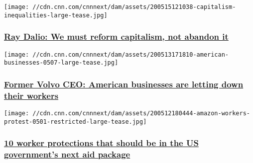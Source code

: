 \texttt{[image: //cdn.cnn.com/cnnnext/dam/assets/200515121038-capitalism-inequalities-large-tease.jpg]}

\hypertarget{ray-dalio-we-must-reform-capitalism-not-abandon-it}{%
\subsubsection{\texorpdfstring{\href{/2020/05/15/perspectives/ray-dalio-capitalism/index.html}{Ray
Dalio: We must reform capitalism, not abandon
it}}{Ray Dalio: We must reform capitalism, not abandon it}}\label{ray-dalio-we-must-reform-capitalism-not-abandon-it}}

\href{/2020/05/14/perspectives/volvo-leadership-coronavirus-pandemic/index.html}{}

\texttt{[image: //cdn.cnn.com/cnnnext/dam/assets/200513171810-american-businesses-0507-large-tease.jpg]}

\hypertarget{former-volvo-ceo-american-businesses-are-letting-down-their-workers}{%
\subsubsection{\texorpdfstring{\href{/2020/05/14/perspectives/volvo-leadership-coronavirus-pandemic/index.html}{Former
Volvo CEO: American businesses are letting down their
workers}}{Former Volvo CEO: American businesses are letting down their workers}}\label{former-volvo-ceo-american-businesses-are-letting-down-their-workers}}

\href{/2020/05/13/perspectives/stimulus-package-worker-protections/index.html}{}

\texttt{[image: //cdn.cnn.com/cnnnext/dam/assets/200512180444-amazon-workers-protest-0501-restricted-large-tease.jpg]}

\hypertarget{10-worker-protections-that-should-be-in-the-us-governments-next-aid-package}{%
\subsubsection{\texorpdfstring{\href{/2020/05/13/perspectives/stimulus-package-worker-protections/index.html}{10
worker protections that should be in the US government's next aid
package}}{10 worker protections that should be in the US government's next aid package}}\label{10-worker-protections-that-should-be-in-the-us-governments-next-aid-package}}

\href{/2020/05/11/perspectives/consumer-confidence-coronavirus/index.html}{}

